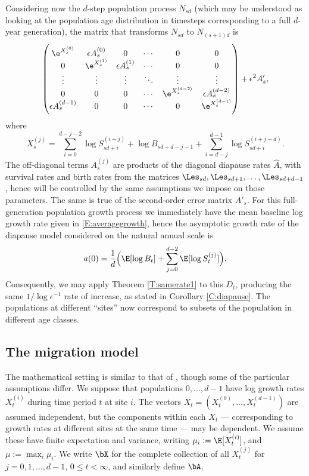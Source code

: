 \documentclass[11pt]{amsart}
\begin{document}
Considering now the $d$-step population process $N_{sd}$ (which may be understood as looking at the population age distribution in timesteps corresponding to a full $d$-year generation), the matrix that transforms $N_{sd}$ to $N_{(s+1)d}$ is
\begin{equation}
	\label{E:diapauseDs}
	 \begin{pmatrix}
		\e^{X_s^{(0)}} & \epsilon A_s^{(0)} & 0&\cdots & 0 & 0\\
		0 & \e^{X_s^{(1)}} & \epsilon A_s^{(1)} &\cdots & 0 & 0\\
		\vdots&\vdots&\vdots&\ddots & \vdots& \vdots\\
		0&0&0&\cdots & \e^{X_s^{(d-2)}}& \epsilon A_s^{(d-2)}\\
		\epsilon A_s^{(d-1)} & 0 & 0 & \cdots & 0 & \e^{X_s^{(d-1)}}
	\end{pmatrix}
	+
	\epsilon^2 A'_s,
\end{equation}
where
$$
X_s^{(j)} = \sum_{i=0}^{d-j-2} \log S_{sd+i}^{(i+j)} +  \log B_{sd+d-j-1}  + \sum_{i=d-j}^{d-1} \log S_{sd+i}^{(i+j-d)}.
$$
The off-diagonal terms $A_s^{(j)}$ are products of the diagonal diapause rates $\widehat{A}$, with survival rates and birth rates from the matrices $\Les_{sd},\Les_{sd+1},\dots,\Les_{sd+d-1}$, hence will be controlled by the same assumptions we impose on those parameters.
The same is true of the second-order error matrix $A'_s$.
For this full-generation population growth process we immediately have the mean baseline log growth rate given in \eqref{E:averagegrowth}, hence the asymptotic growth rate of the diapause model considered on the natural annual scale is
\begin{equation} \label{E:a0diapause}
	a(0)=\frac{1}{d}\Bigl(\E[\log B_{t}]+\sum_{j=0}^{d-2} \E[\log S_{t}^{(j)}]\Bigr).
\end{equation}
Consequently, we may apply Theorem \ref{T:samerate1} to this $D_{t}$, producing the same
$1/\log\epsilon^{-1}$ rate of increase, as stated in Corollary \ref{C:diapause}. 
The populations at different ``sites'' now correspond to subsets of the population in different age classes.

\subsection{The migration model} \label{sec:migration}
The mathematical setting is similar to that of \cite{migration2018}, though some of the particular
assumptions differ.
We suppose that populations $0, \dots, d-1$ have log growth
rates $X_t^{(i)}$ during time period $t$ at site $i$. The
vectors $X_t=(X_t^{(0)},\dots, X_t^{(d-1)})$ are assumed
independent, but the components within each $X_t$ ---
corresponding to growth rates at different sites at the same time
--- may be dependent. We assume these have finite expectation and variance,
writing ${\mu_i:= \E[X_t^{(i)}]}$, and $\mu:=\max_i \mu_i$. 
We write $\bX$ for the complete collection of all $X^{(j)}_{t}$ for ${j=0,1,\dots,d-1}$,
$0\le t<\infty$, and similarly define $\bA$.
\end{document}

